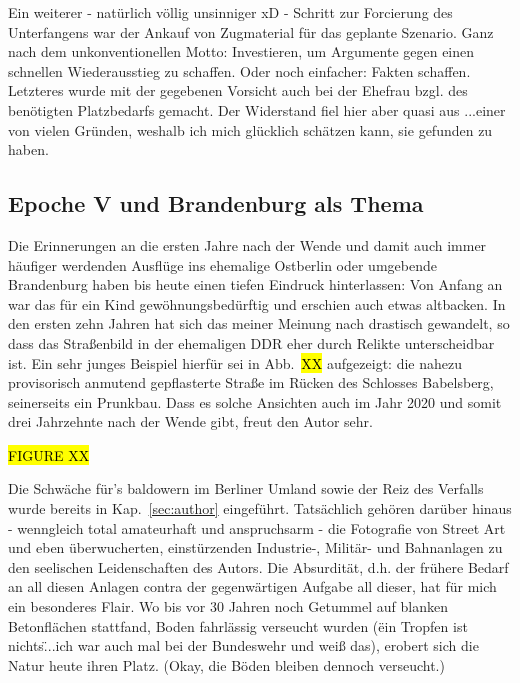 Ein weiterer - nat\"urlich v\"ollig unsinniger xD - Schritt zur Forcierung des Unterfangens war der Ankauf von Zugmaterial f\"ur das geplante Szenario.
Ganz nach dem unkonventionellen Motto: Investieren, um Argumente gegen einen schnellen Wiederausstieg zu schaffen.
Oder noch einfacher: Fakten schaffen.
Letzteres wurde mit der gegebenen Vorsicht auch bei der Ehefrau bzgl. des ben\"otigten Platzbedarfs gemacht.
Der Widerstand fiel hier aber quasi aus ...einer von vielen Gr\"unden, weshalb ich mich gl\"ucklich sch\"atzen kann, sie gefunden zu haben.



\subsection{Epoche V und Brandenburg als Thema}
\label{sec:theme}

Die Erinnerungen an die ersten Jahre nach der Wende und damit auch immer h\"aufiger werdenden Ausfl\"uge ins ehemalige Ostberlin oder umgebende Brandenburg haben bis heute einen tiefen Eindruck hinterlassen:
Von Anfang an war das f\"ur ein Kind gew\"ohnungsbed\"urftig und erschien auch etwas altbacken.
In den ersten zehn Jahren hat sich das meiner Meinung nach drastisch gewandelt, so dass das Stra{\ss}enbild in der ehemaligen DDR eher durch Relikte unterscheidbar ist.
Ein sehr junges Beispiel hierf\"ur sei in Abb.~\hl{XX} aufgezeigt:
die nahezu provisorisch anmutend gepflasterte Stra{\ss}e im R\"ucken des Schlosses Babelsberg, seinerseits ein Prunkbau.
Dass es solche Ansichten auch im Jahr 2020 und somit drei Jahrzehnte nach der Wende gibt, freut den Autor sehr.

\hl{FIGURE XX}

Die Schw\"ache f\"ur's baldowern im Berliner Umland sowie der Reiz des Verfalls wurde bereits in Kap.~\ref{sec:author} eingef\"uhrt.
Tats\"achlich geh\"oren dar\"uber hinaus - wenngleich total amateurhaft und anspruchsarm - die Fotografie von Street Art und eben \"uberwucherten, einst\"urzenden Industrie-, Milit\"ar- und Bahnanlagen zu den seelischen Leidenschaften des Autors.
Die Absurdit\"at, d.h. der fr\"uhere Bedarf an all diesen Anlagen contra der gegenw\"artigen Aufgabe all dieser, hat f\"ur mich ein besonderes Flair.
Wo bis vor 30 Jahren noch Getummel auf blanken Betonfl\"achen stattfand, Boden fahrl\"assig verseucht wurden (\"ein Tropfen ist nichts\" ...ich war auch mal bei der Bundeswehr und wei{\ss} das), erobert sich die Natur heute ihren Platz.
(Okay, die B\"oden bleiben dennoch verseucht.)


